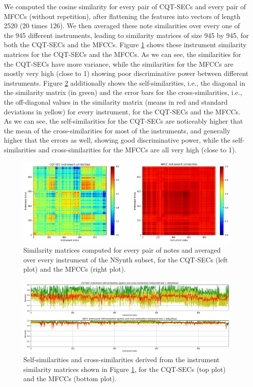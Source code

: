 \documentclass[journal]{IEEEtran}
\begin{document}
We computed the cosine similarity for every pair of CQT-SECs and every pair of MFCCs (without repetition), after flattening the features into vectors of length 2520 (20 times 126). We then averaged these note similarities over every one of the 945 different instruments, leading to similarity matrices of size 945 by 945, for both the CQT-SECs and the MFCCs. Figure \ref{fig:instrument_similarities} shows these instrument similarity matrices for the CQT-SECs and the MFCCs. As we can see, the similarities for the CQT-SECs have more variance, while the similarities for the MFCCs are mostly very high (close to 1) showing poor discriminative power between different instruments. Figure \ref{fig:instrument_similarities2} additionally shows the self-similarities, i.e., the diagonal in the similarity matrix (in green) and the error bars for the cross-similarities, i.e., the off-diagonal values in the similarity matrix (means in red and standard deviations in yellow) for every instrument, for the CQT-SECs and the MFCCs. As we can see, the self-similarities for the CQT-SECs are noticeably higher that the mean of the cross-similarities for most of the instruments, and generally higher that the errors as well, showing good discriminative power, while the self-similarities and cross-similarities for the MFCCs are all very high (close to 1).

\begin{figure}[htp]
    \centering
    \includegraphics[width=\textwidth]{instrument_similarities.png}
    \caption{Similarity matrices computed for every pair of notes and averaged over every instrument of the NSynth subset, for the CQT-SECs (left plot) and the MFCCs (right plot).}
    \label{fig:instrument_similarities}
\end{figure}

\begin{figure}[htp]
    \centering
    \includegraphics[width=\textwidth]{instrument_similarities2.png}
    \caption{Self-similarities and cross-similarities derived from the instrument similarity matrices shown in Figure \ref{fig:instrument_similarities}, for the CQT-SECs (top plot) and the MFCCs (bottom plot).}
    \label{fig:instrument_similarities2}
\end{figure}
\end{document}
